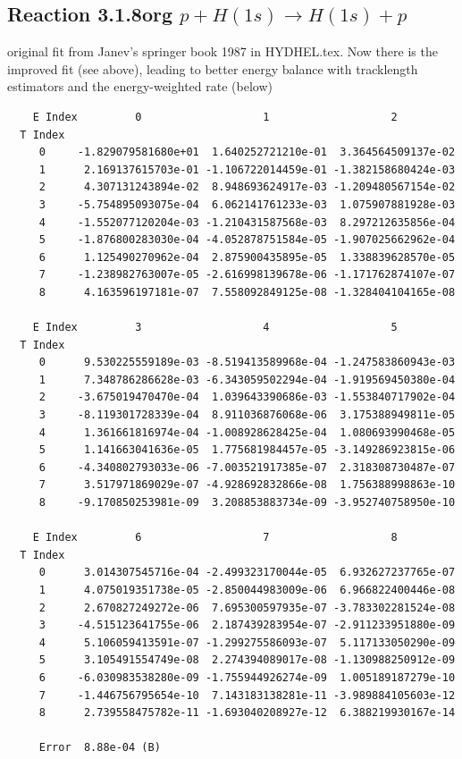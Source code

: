 \documentclass[12pt,dvipdfmx]{article}
\begin{document}
\subsection{
Reaction 3.1.8org $ p + H(1s) \rightarrow H(1s) + p   $
}
original fit from Janev's springer book 1987
in HYDHEL.tex. Now there is the improved fit (see above), leading to better
energy balance with tracklength estimators and the energy-weighted rate (below)

\begin{small}\begin{verbatim}
    E Index         0                   1                   2
  T Index
     0     -1.829079581680e+01  1.640252721210e-01  3.364564509137e-02
     1      2.169137615703e-01 -1.106722014459e-01 -1.382158680424e-03
     2      4.307131243894e-02  8.948693624917e-03 -1.209480567154e-02
     3     -5.754895093075e-04  6.062141761233e-03  1.075907881928e-03
     4     -1.552077120204e-03 -1.210431587568e-03  8.297212635856e-04
     5     -1.876800283030e-04 -4.052878751584e-05 -1.907025662962e-04
     6      1.125490270962e-04  2.875900435895e-05  1.338839628570e-05
     7     -1.238982763007e-05 -2.616998139678e-06 -1.171762874107e-07
     8      4.163596197181e-07  7.558092849125e-08 -1.328404104165e-08

    E Index         3                   4                   5
  T Index
     0      9.530225559189e-03 -8.519413589968e-04 -1.247583860943e-03
     1      7.348786286628e-03 -6.343059502294e-04 -1.919569450380e-04
     2     -3.675019470470e-04  1.039643390686e-03 -1.553840717902e-04
     3     -8.119301728339e-04  8.911036876068e-06  3.175388949811e-05
     4      1.361661816974e-04 -1.008928628425e-04  1.080693990468e-05
     5      1.141663041636e-05  1.775681984457e-05 -3.149286923815e-06
     6     -4.340802793033e-06 -7.003521917385e-07  2.318308730487e-07
     7      3.517971869029e-07 -4.928692832866e-08  1.756388998863e-10
     8     -9.170850253981e-09  3.208853883734e-09 -3.952740758950e-10

    E Index         6                   7                   8
  T Index
     0      3.014307545716e-04 -2.499323170044e-05  6.932627237765e-07
     1      4.075019351738e-05 -2.850044983009e-06  6.966822400446e-08
     2      2.670827249272e-06  7.695300597935e-07 -3.783302281524e-08
     3     -4.515123641755e-06  2.187439283954e-07 -2.911233951880e-09
     4      5.106059413591e-07 -1.299275586093e-07  5.117133050290e-09
     5      3.105491554749e-08  2.274394089017e-08 -1.130988250912e-09
     6     -6.030983538280e-09 -1.755944926274e-09  1.005189187279e-10
     7     -1.446756795654e-10  7.143183138281e-11 -3.989884105603e-12
     8      2.739558475782e-11 -1.693040208927e-12  6.388219930167e-14

     Error  8.88e-04 (B)
\end{verbatim}\end{small}
\end{document}
